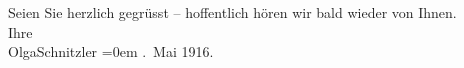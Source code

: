 \pstart
           Seien Sie herzlich gegrüsst – hoffentlich hören wir bald wieder von Ihnen.{\\[\baselineskip]}Ihre{\\[\baselineskip]}\spacefill\mbox{OlgaSchnitzler}\pend
           \leftskip=0em{}
. Mai 1916.\pend
           \endnumbering{}  
      